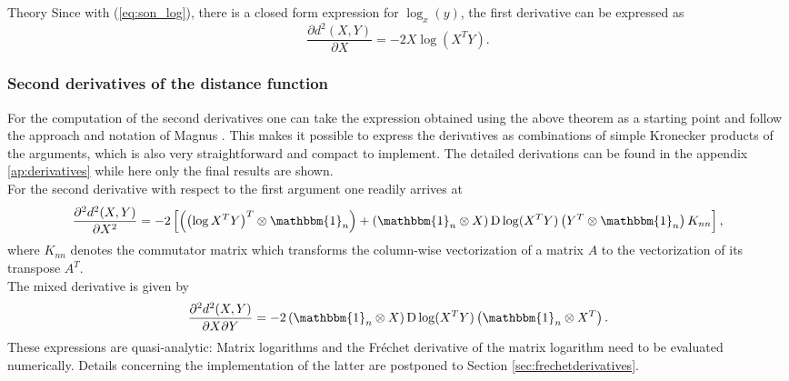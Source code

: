 \begin{chapter}{Theory}
Since with (\ref{eq:son_log}), there is a closed form expression for $\log_x(y)$, the first derivative can be expressed as
\begin{equation}
    \frac{\partial d^2(X,Y)}{\partial X} = -2X\log(X^TY).
\end{equation}

\subsubsection{Second derivatives of the distance function} %
\label{ssub:SecondDerSO}
For the computation of the second derivatives one can take the expression obtained using the above theorem as a starting point and follow the approach and notation of Magnus \cite{Magnus}. 
This makes it possible to express the derivatives as combinations of simple Kronecker products of the arguments, which is also very straightforward and compact to implement. 
The detailed derivations can be found in the appendix \ref{ap:derivatives} while here only the final results are shown. \\
For the second derivative with respect to the first argument one readily arrives at
\begin{equation}
    \label{eq:son_xx_der}
    \frac{\partial^2 d^2(X,Y)}{\partial X^2} = -2\left[\left(\left(\log X^TY\right)^T\otimes\mathbbm{1}_n\right) + \left(\mathbbm{1}_n\otimes X \right)\operatorname{D}\log(X^TY) \left(Y^T\otimes\mathbbm{1}_n \right) K_{nn}\right],
\end{equation}
where $K_{nn}$ denotes the commutator matrix which transforms the column-wise vectorization of a matrix $A$ to the vectorization of its transpose $A^T$.\\

The mixed derivative is given by
\begin{equation}
    \label{eq:son_xy_der}
    \frac{\partial^2 d^2(X,Y)}{\partial X\partial Y} = -2\left(\mathbbm{1}_n\otimes X \right)\operatorname{D}\log(X^TY) \left(\mathbbm{1}_n\otimes X^T \right).
\end{equation}
These expressions are quasi-analytic: Matrix logarithms and the Fr\'{e}chet derivative of the matrix logarithm need to be evaluated numerically. Details concerning the 
implementation of the latter are postponed to Section \ref{sec:frechetderivatives}.


\end{chapter}
